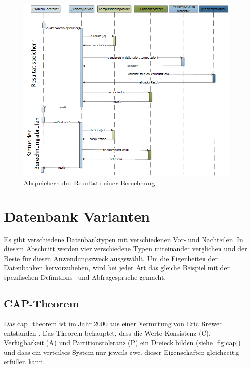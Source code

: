 \begin{figure}[h]
\centering
\includegraphics[scale=0.72]{images/visio/sequenz_diagramm_result.png}
\caption[Abspeichern des Resultats einer Berechnung]{Abspeichern des Resultats einer Berechnung \selfmade{}}
\label{fig:sequenz_diagramm_result}
\end{figure}

\section{Datenbank Varianten}\label{db_varianten}
Es gibt verschiedene Datenbanktypen mit verschiedenen Vor- und Nachteilen. In diesem Abschnitt werden vier verschiedene Typen miteinander verglichen und der Beste für diesen 
Anwendungszweck ausgewählt. Um die Eigenheiten der Datenbanken hervorzuheben, wird bei jeder Art das gleiche Beispiel mit der spezifischen Definitions-- und Abfragesprache gemacht.

\subsection{CAP-Theorem}\label{cap_theorem}
Das \gls{cap_theorem} ist im Jahr 2000 aus einer Vermutung von Eric Brewer entstanden \cite{cap_brewer}. Das Theorem behauptet, dass die Werte Konsistenz (C), Verfügbarkeit (A) und 
Partitionstoleranz (P) ein Dreieck bilden (siehe \autoref{fig:cap}) und dass ein verteiltes System nur jeweils zwei dieser Eigenschaften gleichzeitig erfüllen kann.

